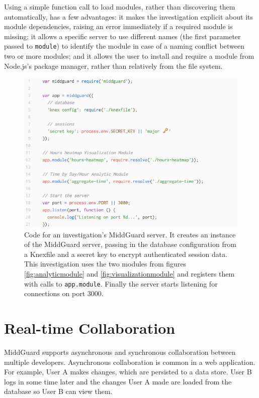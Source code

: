 \documentclass[midd]{thesis}
\begin{document}
Using a simple function call to load modules, rather than discovering them
automatically, has a few advantages: it makes the investigation explicit about
its module dependencies, raising an error immediately if a required module is
missing; it allows a specific server to use different names (the first parameter
passed to \texttt{module}) to identify the module in case of a naming conflict
between two or more modules; and it allows the user to install and require a
module from Node.js's package manager, rather than relatively from the file
system.

\begin{figure}[!ht]
  \centering
  \includegraphics[width=.85\textwidth]{middguardproject}
  \caption{Code for an investigation's MiddGuard server. It creates an instance
  of the MiddGuard server, passing in the database configuration from a Knexfile
  \cite{knexjs} and a secret key to encrypt authenticated session data. This
  investigation uses the two modules from figures \ref{fig:analyticmodule} and
  \ref{fig:visualizationmodule} and registers them with calls to
  \texttt{app.module}. Finally the server starts listening for connections on
  port 3000.}
  \label{fig:middguardproject}
\end{figure}

\section{Real-time Collaboration}

MiddGuard supports asynchronous and synchronous collaboration between multiple
developers. Asynchronous collaboration is common in a web application. For
example, User A makes changes, which are persisted to a data store. User B logs
in some time later and the changes User A made are loaded from the database so
User B can view them.
\end{document}
